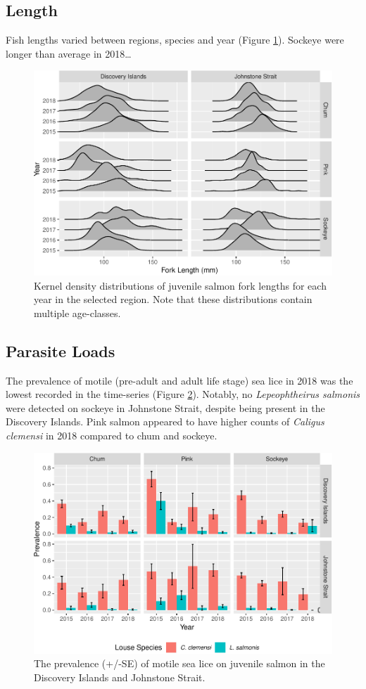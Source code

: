 \documentclass[fleqn,10pt]{wlpeerj} %
\begin{document}
\subsection*{Length}\label{length}

Fish lengths varied between regions, species and year (Figure
\ref{fig:length}). Sockeye were longer than average in 2018\ldots{}

\begin{figure}
\includegraphics[width=0.8\linewidth]{peer_j_migration_dynamics_files/figure-latex/length-1} \caption{Kernel density distributions of juvenile salmon fork lengths for each year in the selected region. Note that these distributions contain multiple age-classes.}\label{fig:length}
\end{figure}

\subsection*{Parasite Loads}\label{parasite-loads}

The prevalence of motile (pre-adult and adult life stage) sea lice in
2018 was the lowest recorded in the time-series (Figure
\ref{fig:sealice}). Notably, no \emph{Lepeophtheirus salmonis} were
detected on sockeye in Johnstone Strait, despite being present in the
Discovery Islands. Pink salmon appeared to have higher counts of
\emph{Caligus clemensi} in 2018 compared to chum and sockeye.

\begin{figure}
\includegraphics[width=0.8\linewidth]{peer_j_migration_dynamics_files/figure-latex/sealice-1} \caption{The prevalence (+/-SE) of motile sea lice on juvenile salmon in the Discovery Islands and Johnstone Strait.}\label{fig:sealice}
\end{figure}
\end{document}
